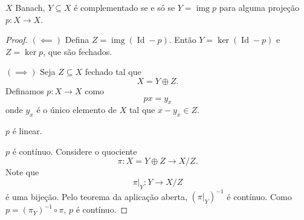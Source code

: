 \documentclass[portuguese]{article}
\theoremstyle{definition}
\DeclareMathOperator{\img}{img}
\DeclareMathOperator{\Id}{Id}
\begin{document}
\begin{prop}
	$X$ Banach, $Y\subseteq X$ é complementado se e só se $Y=\img p$ para alguma projeção $p:X\to X$.
\end{prop}
\begin{proof}\leavevmode
	
	$(\impliedby)$ Defina $Z=\img(\Id-p)$. Então $Y=\ker(\Id-p)$ e $Z=\ker p$, que são fechados.
	
	$(\implies)$ Seja $Z\subseteq X$ fechado tal que
	\[X=Y\oplus Z.\]
	Definamos $p:X\to X$ como
	\[px=y_x\]
	onde $y_x$ é o único elemento de $X$ tal que $x-y_x\in Z$.
	
	{\color{orange} $p$ é linear}.
	
	$p$ é contínuo. Considere o quociente	
	\[\pi:X=Y\oplus Z\to X/Z.\]
	Note que
	\[\pi|_Y:Y\to X/Z\]
	é uma bijeção. Pelo teorema da aplicação aberta, $(\pi|_Y)^{-1}$ é contínuo. Como $p=(\pi_Y)^{-1}\circ\pi$, $p$ é contínuo.
\end{proof}
\end{document}
